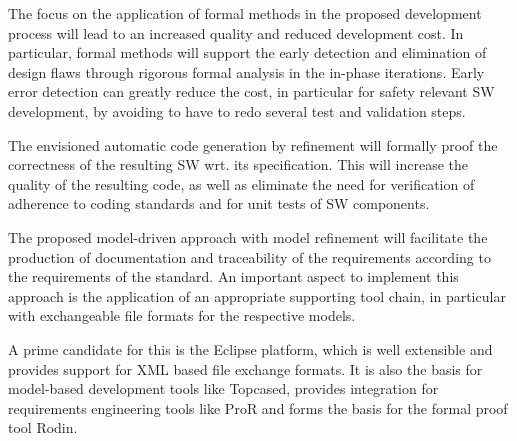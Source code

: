 The focus on the application of formal methods in the proposed development
process will lead to an increased quality and reduced development cost. In
particular, formal methods will support the early detection and elimination of
design flaws through rigorous formal analysis in the in-phase iterations. Early
error detection can greatly reduce the cost, in particular for safety relevant
SW development, by avoiding to have to redo several test and validation steps.

The envisioned automatic code generation by refinement will formally proof the
correctness of the resulting SW wrt. its specification. This will increase the
quality of the resulting code, as well as eliminate the need for verification of
adherence to coding standards and for unit tests of SW components.

The proposed model-driven approach with model refinement will facilitate the
production of documentation and traceability of the requirements according to
the requirements of the standard. An important aspect to implement this approach
is the application of an appropriate supporting tool chain, in particular with
exchangeable file formats for the respective models.

A prime candidate for this is the Eclipse platform, which is well extensible and
provides support for XML based file exchange formats. It is also the basis for
model-based development tools like Topcased, provides integration for
requirements engineering tools like ProR and forms the basis for the formal
proof tool Rodin.


